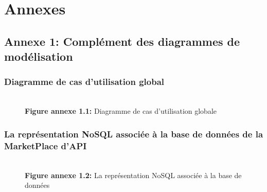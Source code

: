 \chapter*{Annexes }


\section{Annexe 1: Complément des diagrammes de modélisation}
\subsection{Diagramme de cas d'utilisation global}
\begin{figure}[H]
    \centering
    {\\\textbf{Figure annexe 1.1:} Diagramme de cas d'utilisation globale}
\end{figure}


\subsection{La représentation NoSQL associée à la base de données de la MarketPlace d’API}

\begin{figure}[H]
    \centering
    {\\\textbf{Figure annexe 1.2:} La représentation NoSQL associée à la base de données }
\end{figure}




